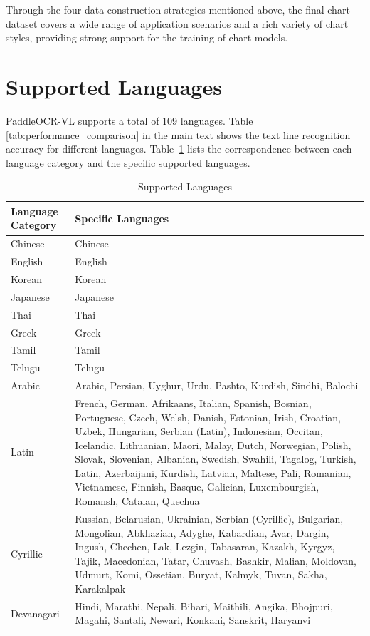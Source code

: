 \documentclass[11pt, a4paper,logo,  copyright, nonumbering]{paddleocr}
\begin{document}
\par Through the four data construction strategies mentioned above, the final chart dataset covers a wide range of application scenarios and a rich variety of chart styles, providing strong support for the training of chart models.

\clearpage 
\newpage

\section{Supported Languages}

PaddleOCR-VL supports a total of 109 languages. Table \ref{tab:performance_comparison} in the main text shows the text line recognition accuracy for different languages. Table~\ref{tab:supported_language} lists the correspondence between each language category and the specific supported languages.

\begin{table}[ht]
\centering
\begin{tabular}{>{\centering\arraybackslash}m{}|>{\centering\arraybackslash}m{}}
\toprule
\textbf{Language Category} & \textbf{Specific Languages} \\
\midrule
Chinese & Chinese \\
\midrule
English & English \\
\midrule
Korean & Korean \\
\midrule
Japanese & Japanese \\
\midrule
Thai & Thai\\
\midrule
Greek & Greek \\
\midrule
Tamil & Tamil \\
\midrule
Telugu & Telugu \\
\midrule
Arabic & Arabic, Persian, Uyghur, Urdu, Pashto, Kurdish, Sindhi, Balochi \\
\midrule
Latin & French, German, Afrikaans, Italian, Spanish, Bosnian, Portuguese, Czech, Welsh, Danish, Estonian, Irish, Croatian, Uzbek, Hungarian, Serbian (Latin), Indonesian, Occitan, Icelandic, Lithuanian, Maori, Malay, Dutch, Norwegian, Polish, Slovak, Slovenian, Albanian, Swedish, Swahili, Tagalog, Turkish, Latin, Azerbaijani, Kurdish, Latvian, Maltese, Pali, Romanian, Vietnamese, Finnish, Basque, Galician, Luxembourgish, Romansh, Catalan, Quechua \\
\midrule
Cyrillic & Russian, Belarusian, Ukrainian, Serbian (Cyrillic), Bulgarian, Mongolian, Abkhazian, Adyghe, Kabardian, Avar, Dargin, Ingush, Chechen, Lak, Lezgin, Tabasaran, Kazakh, Kyrgyz, Tajik, Macedonian, Tatar, Chuvash, Bashkir, Malian, Moldovan, Udmurt, Komi, Ossetian, Buryat, Kalmyk, Tuvan, Sakha, Karakalpak \\
\midrule
Devanagari & Hindi, Marathi, Nepali, Bihari, Maithili, Angika, Bhojpuri, Magahi, Santali, Newari, Konkani, Sanskrit, Haryanvi \\
\bottomrule
\end{tabular}
   \caption{Supported Languages}
       \label{tab:supported_language}
\end{table}
\end{document}
